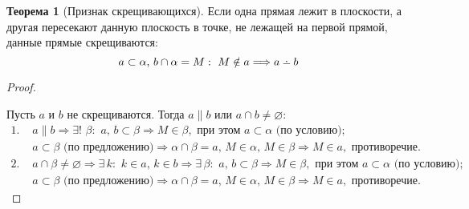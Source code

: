 \documentclass[12pt]{article}
\theoremstyle{definition}
\newtheorem{theorem}{Теорема}[section]
\providecommand{\dotdiv}{%
  \mathbin{%
    \vphantom{+}%
    \text{%
      \mathsurround=0pt %
      \ooalign{%
        \noalign{\kern-.25ex}%
        \hidewidth$\smash{\cdot}$\hidewidth\cr %
        \noalign{\kern.5ex}%
        $-$\cr %
      }%
    }%
  }%
}
\begin{document}
    \begin{theorem}[Признак скрещивающихся]
        Если одна прямая лежит в плоскости, а другая пересекают данную плоскость в точке, не лежащей на первой прямой, данные прямые скрещиваются:
        $$a\subset\alpha,\,b\cap\alpha=M:\,\,M\notin a\Longrightarrow a\dotdiv b$$
    \end{theorem}
    \begin{proof}
        $ $\par\nobreak\ignorespaces
        \begin{center}
        \end{center}
        Пусть $a$ и $b$ не скрещиваются. Тогда $a\parallel b$ или $a\cap b\neq\varnothing:
        $
        \begin{align*}
            1.\,\,&a\parallel b\Longrightarrow\exists!\,\,\beta:\,\,a,\,b\subset\beta\Longrightarrow M\in\beta,\text{ при этом }a\subset\alpha\text{ (по условию); }\\
            &a\subset\beta\text{ (по предложению)}\Longrightarrow \alpha\cap\beta=a,\,M\in\alpha,\,M\in\beta\Longrightarrow M\in a,\text{ противоречие.}\\
            2.\,\,&a\cap\beta\neq\varnothing\Longrightarrow\exists\,k:\,\,k\in a,\,k\in b\Longrightarrow\exists\,\beta:\,\,a,\,b\subset\beta\Longrightarrow M\in\beta,\text{ при этом }a\subset\alpha\text{ (по условию); }\\
            &a\subset\beta\text{ (по предложению)}\Longrightarrow \alpha\cap\beta=a,\,M\in\alpha,\,M\in\beta\Longrightarrow M\in a,\text{ противоречие.}
        \end{align*}
    \end{proof}
\end{document}
